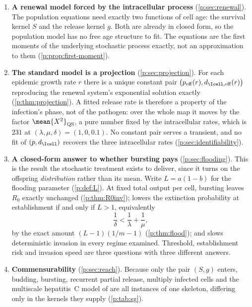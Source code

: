 \begin{enumerate}[leftmargin=1.9em]
\item \textbf{A renewal model forced by the intracellular process}
(\cref{p:sec:renewal}). The population equations need exactly two functions
of cell age: the survival kernel $S$ and the release kernel $g$. Both are
already in closed form, so the population model has no free age structure to
fit. The equations are the first moments of the underlying stochastic
process exactly, not an approximation to them
(\cref{p:prop:first-moment}).

\item \textbf{The standard model is a projection}
(\cref{p:sec:projection}). For each epidemic growth rate $r$ there is a
unique constant pair $\bigl(p_{\rm eff}(r),d_{\Icell,{\rm eff}}(r)\bigr)$
reproducing the renewal system's exponential solution exactly
(\cref{p:thm:projection}). A fitted release rate is therefore a property of
the infection's phase, not of the pathogen: over the whole map it moves by
the factor $\mean{X^2}_{\rm QS}$, a pure number fixed by the intracellular
rates, which is $231$ at $(\lambda,\mu,\delta)=(1,0,0.1)$. No constant pair
serves a transient, and no fit of $(p,d_{\Icell})$ recovers the three
intracellular rates (\cref{p:sec:identifiability}).

\item \textbf{A closed-form answer to whether bursting pays}
(\cref{p:sec:flooding}). This is the result the stochastic treatment exists
to deliver, since it turns on the offspring \emph{distribution} rather than
its mean. Write $L=a(1-b)$ for the flooding parameter
(\cref{p:def:L}). At fixed total output per cell, bursting leaves $R_0$
exactly unchanged (\cref{p:thm:R0inv}); lowers the extinction probability at
establishment if and only if $L>1$, equivalently
\begin{equation*}
\frac{1}{\delta}<\frac{1}{\lambda}+\frac{1}{\mu},
\end{equation*}
by the exact amount $(L-1)(1/m-1)$ (\cref{p:thm:flood}); and slows
deterministic invasion in every regime examined. Threshold, establishment
risk and invasion speed are three questions with three different answers.

\item \textbf{Commensurability} (\cref{p:sec:reach}). Because only the pair
$(S,g)$ enters, budding, bursting, recurrent partial release, multiply
infected cells and the multiscale hepatitis~C model of
\cite{guedj2013modeling,rong2013mathematical} are all instances of one
skeleton, differing only in the kernels they supply
(\cref{p:tab:sg}).
\end{enumerate}

